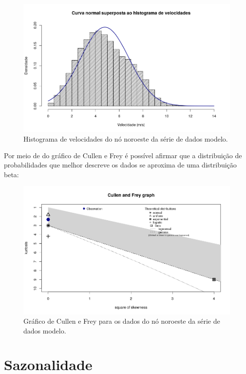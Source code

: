 \documentclass[
	12pt,				%
	openright,			%
	oneside,			%
	a4paper,			%
	english,			%
	french,				%
	spanish,			%
	brazil				%
	]{abntex2}
\begin{document}
\begin{figure}[h]
    \centering
	\includegraphics[width=\textwidth]{normal_overlay}
	\caption{Histograma de velocidades do nó noroeste da série de dados modelo.}
\end{figure}
\FloatBarrier

Por meio de do gráfico de Cullen e Frey é possível afirmar que a distribuição de probabilidades que melhor descreve os dados se aproxima de uma distribuição beta:

\begin{figure}[h]
    \centering
	\includegraphics[width=\textwidth]{cullen}
	\caption{Gráfico de Cullen e Frey para os dados do nó noroeste da série de dados modelo.}
	\label{fig:cullen}
\end{figure}
\FloatBarrier

\section{Sazonalidade}
\end{document}

